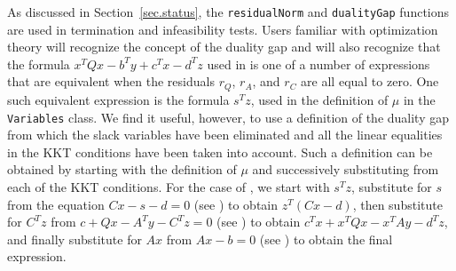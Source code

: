 As discussed in Section~\ref{sec.status}, the {\tt residualNorm} and
{\tt dualityGap} functions are used in termination and infeasibility
tests.  Users familiar with optimization theory will recognize the
concept of the duality gap and will also recognize that the formula
$x^TQx - b^Ty + c^Tx - d^Tz$ used in  is one of a number
of expressions that are equivalent when the residuals $r_Q$, $r_A$,
and $r_C$ are all equal to zero. One such equivalent expression is the
formula $s^T z$, used in the definition of $\mu$ in the {\tt
Variables} class. We find it useful, however, to use a definition of
the duality gap from which the slack variables have been eliminated
and all the linear equalities in the KKT conditions have been taken
into account. Such a definition can be obtained by starting with the
definition of $\mu$ and successively substituting from each of the KKT
conditions. For the case of , we start with $s^Tz$,
substitute for $s$ from the equation $Cx-s-d=0$ (see )
to obtain $z^T(Cx-d)$, then substitute for $C^Tz$ from $c + Q x - A^T
y - C^T z = 0$ (see ) to obtain $c^Tx + x^TQx - x^TAy
- d^Tz$, and finally substitute for $Ax$ from $Ax-b=0$ (see
) to obtain the final expression.

% 

